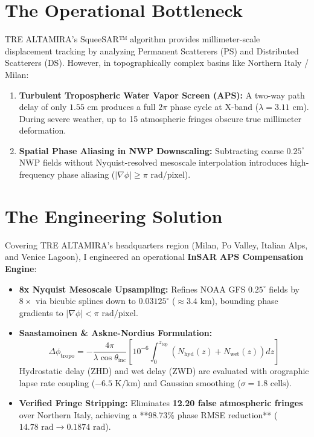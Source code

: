 \documentclass[10pt,letterpaper]{article}
\begin{document}
\noindent
\begin{minipage}[t]{0.51\textwidth}
    \section*{The Operational Bottleneck}
    \footnotesize
    TRE ALTAMIRA's SqueeSAR™ algorithm provides millimeter-scale displacement tracking by analyzing Permanent Scatterers (PS) and Distributed Scatterers (DS). However, in topographically complex basins like Northern Italy / Milan:
    \begin{enumerate}[leftmargin=12pt,topsep=1pt,itemsep=1pt,parsep=0pt]
        \item \textbf{Turbulent Tropospheric Water Vapor Screen (APS):} A two-way path delay of only $1.55\text{ cm}$ produces a full $2\pi$ phase cycle at X-band ($\lambda = 3.11\text{ cm}$). During severe weather, up to 15 atmospheric fringes obscure true millimeter deformation.
        \item \textbf{Spatial Phase Aliasing in NWP Downscaling:} Subtracting coarse $0.25^\circ$ NWP fields without Nyquist-resolved mesoscale interpolation introduces high-frequency phase aliasing ($|\nabla \phi| \ge \pi\text{ rad/pixel}$).
    \end{enumerate}

    \section*{The Engineering Solution}
    \footnotesize
    Covering TRE ALTAMIRA's headquarters region (Milan, Po Valley, Italian Alps, and Venice Lagoon), I engineered an operational \textbf{InSAR APS Compensation Engine}:
    \begin{itemize}[leftmargin=12pt,topsep=1pt,itemsep=1pt,parsep=0pt]
        \item \textbf{8x Nyquist Mesoscale Upsampling:} Refines NOAA GFS $0.25^\circ$ fields by $8\times$ via bicubic splines down to $0.03125^\circ$ ($\approx 3.4\text{ km}$), bounding phase gradients to $|\nabla \phi| < \pi\text{ rad/pixel}$.
        \item \textbf{Saastamoinen \& Askne-Nordius Formulation:}
        \begin{equation*}
            \Delta \phi_{\text{tropo}} = -\frac{4\pi}{\lambda \cos \theta_{\text{inc}}} \left[ 10^{-6} \int_0^{z_{\text{top}}} \left( N_{\text{hyd}}(z) + N_{\text{wet}}(z) \right) dz \right]
        \end{equation*}
        Hydrostatic delay (ZHD) and wet delay (ZWD) are evaluated with orographic lapse rate coupling ($-6.5\text{ K/km}$) and Gaussian smoothing ($\sigma = 1.8\text{ cells}$).
        \item \textbf{Verified Fringe Stripping:} Eliminates \textbf{12.20 false atmospheric fringes} over Northern Italy, achieving a **98.73\% phase RMSE reduction** ($14.78\text{ rad} \rightarrow 0.1874\text{ rad}$).
    \end{itemize}


\end{minipage}
\end{document}
